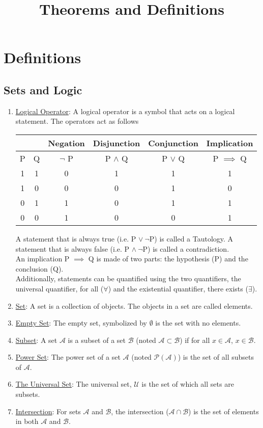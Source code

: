 \documentclass{hw}
\title{Theorems and Definitions}
\date{}
\author{}
\newcommand{\Define}[1]{\item\underline{#1}:}
\newcommand{\set}[1]{\mathcal{#1}}
\newcommand{\setA}{\mathcal{A}}
\newcommand{\setB}{\mathcal{B}}
\newcommand{\setU}{\set{U}}
\begin{document}
\maketitle

\section{Definitions}

\subsection{Sets and Logic}
\begin{enumerate}
\Define{Logical Operator} A logical operator is a symbol that acts on a logical statement. The operators act as follows
\begin{center}
\begin{tabular}{|c|c|c|c|c|c|}
\hline
& & Negation & Disjunction & Conjunction & Implication\\
\hline
P & Q & $\neg$ P & P $\wedge$ Q & P $\vee$ Q & P $\implies$ Q \\
\hline
1 & 1 & 0 & 1 & 1 & 1\\
1 & 0 & 0 & 0 & 1 & 0\\
0 & 1 & 1 & 0 & 1 & 1\\
0 & 0 & 1 & 0 & 0 & 1\\
\hline
\end{tabular}
\end{center}
A statement that is always true (i.e. P $\vee\ \neg$P) is called a Tautology. A statement that is always false (i.e. P $\wedge\ \neg$P) is called a contradiction.\\
An implication P $\implies$ Q is made of two parts: the hypothesis (P) and the conclusion (Q).\\
Additionally, statements can be quantified using the two quantifiers, the universal quantifier, for all ($\forall$) and the existential quantifier, there exists ($\exists$).
\Define{Set} A set is a collection of objects. The objects in a set are called elements.
\Define{Empty Set} The empty set, symbolized by $\emptyset$ is the set with no elements.
\Define{Subset} A set $\setA$ is a subset of a set $\setB$ (noted $\setA\subset\setB$) if for all $x\in\setA$, $x\in\setB$.
\Define{Power Set} The power set of a set $\setA$ (noted $\set{P}(\setA)$) is the set of all subsets of $\setA$.
\Define{The Universal Set} The universal set, $\setU$ is the set of which all sets are subsets.
\Define{Intersection} For sets $\setA$ and $\setB$, the intersection ($\setA\cap\setB$) is the set of elements in both $\setA$ and $\setB$.

\end{enumerate}
\end{document}
